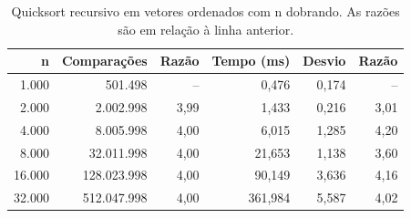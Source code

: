 \begin{table}[htbp]
  \centering
  \small
  \setlength{\tabcolsep}{4pt}
  \caption{Quicksort recursivo em vetores ordenados com n dobrando. As razões são em relação à linha anterior.}
  \label{tab:crescimento}
  \begin{tabular}{rrrrrr}
    \toprule
    n & Comparações & Razão & Tempo (ms) & Desvio & Razão \\
    \midrule
    1.000 & 501.498 & -- & 0,476 & 0,174 & -- \\
    2.000 & 2.002.998 & 3,99 & 1,433 & 0,216 & 3,01 \\
    4.000 & 8.005.998 & 4,00 & 6,015 & 1,285 & 4,20 \\
    8.000 & 32.011.998 & 4,00 & 21,653 & 1,138 & 3,60 \\
    16.000 & 128.023.998 & 4,00 & 90,149 & 3,636 & 4,16 \\
    32.000 & 512.047.998 & 4,00 & 361,984 & 5,587 & 4,02 \\
    \bottomrule
  \end{tabular}
\end{table}
